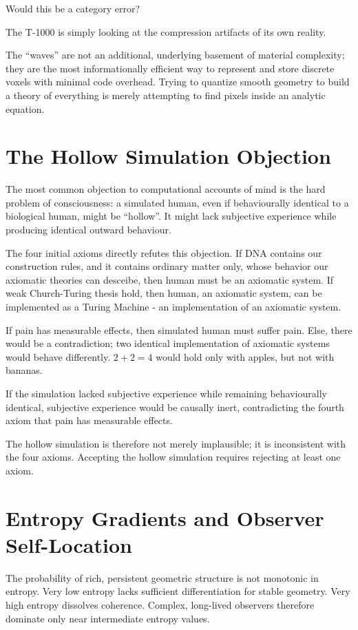 Would this be a category error?

The T-1000 is simply looking at the compression artifacts of its own reality.

The ``waves'' are not an additional, underlying basement of material complexity; they are the most informationally efficient way to represent and store discrete voxels with minimal code overhead.
Trying to quantize smooth geometry to build a theory of everything is merely attempting to find pixels inside an analytic equation.


\section{The Hollow Simulation Objection}

The most common objection to computational accounts of mind is the hard
problem of consciousness: a simulated human, even if
behaviourally identical to a biological human, might be ``hollow''. It
might lack subjective experience while producing identical outward behaviour.

The four initial axioms directly refutes this
objection. If DNA contains our construction rules, and it contains ordinary
matter only, whose behavior our axiomatic theories can desceibe, then human
must be an axiomatic system. If weak Church-Turing thesis hold, then human,
an axiomatic system, can be implemented as a Turing Machine - an implementation of
an axiomatic system.

If pain has measurable effects, then simulated human must suffer pain. Else, there would
be a contradiction; two identical implementation of axiomatic systems would
behave differently. $2+2=4$ would hold only with apples, but not with bananas.

If the simulation lacked subjective experience while remaining behaviourally identical, subjective experience
would be causally inert, contradicting the fourth axiom that pain has measurable effects.

The hollow simulation is therefore not merely implausible; it is
inconsistent with the four axioms. Accepting the hollow simulation requires
rejecting at least one axiom.


\section{Entropy Gradients and Observer Self-Location}

The probability of rich, persistent geometric structure is not monotonic in entropy.
Very low entropy lacks sufficient differentiation for stable geometry.
Very high entropy dissolves coherence. Complex, long-lived observers therefore dominate only near intermediate entropy values.

